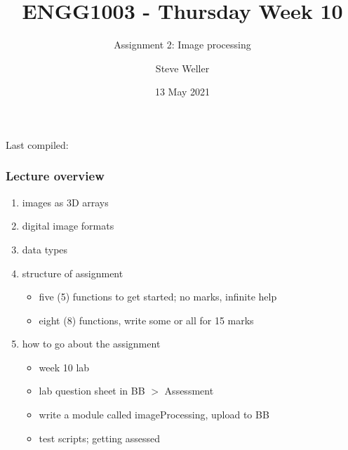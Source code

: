 \documentclass[english,14pt]{beamer}
\title{ENGG1003 - Thursday Week 10}
\subtitle{Assignment 2: Image processing}
\author{Steve Weller}
\institute{University of Newcastle}
\date{13 May 2021}
\begin{document}
\begin{flushleft}
{\scriptsize Last compiled:~\DTMnow}
\vspace*{-5mm}
\end{flushleft}
\framebreak


\begin{frame}[fragile]

\frametitle{Lecture overview}
\begin{enumerate}
	\item images as 3D arrays
	
	\item digital image formats

	\item data types
		
	\item structure of assignment
		\begin{itemize}
			\item five (5) functions to get started; no marks, infinite help
			\item eight (8) functions, write some or all for 15 marks
		\end{itemize}	

	\item how to go about the assignment
		\begin{itemize}
			\item week 10 lab
			\item lab question sheet in BB $>$ Assessment
			\item write a module called imageProcessing, upload to BB
			\item test scripts; getting assessed
		\end{itemize}	
	
\end{enumerate}

\end{frame}
\end{document}
